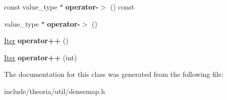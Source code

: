 \begin{DoxyCompactItemize}
\item 
\hypertarget{classtheoria_1_1util_1_1densemap_1_1Iter_ae9448561fab6d17994e686b6c63ad205}{const value\+\_\+type $\ast$ {\bfseries operator-\/$>$} () const }\label{classtheoria_1_1util_1_1densemap_1_1Iter_ae9448561fab6d17994e686b6c63ad205}

\item 
\hypertarget{classtheoria_1_1util_1_1densemap_1_1Iter_acf52921e292fe9aea8383a810dc54aa3}{value\+\_\+type $\ast$ {\bfseries operator-\/$>$} ()}\label{classtheoria_1_1util_1_1densemap_1_1Iter_acf52921e292fe9aea8383a810dc54aa3}

\item 
\hypertarget{classtheoria_1_1util_1_1densemap_1_1Iter_a484492c01c0db1a25dc4e475d99ba82f}{\hyperlink{classtheoria_1_1util_1_1densemap_1_1Iter}{Iter} {\bfseries operator++} ()}\label{classtheoria_1_1util_1_1densemap_1_1Iter_a484492c01c0db1a25dc4e475d99ba82f}

\item 
\hypertarget{classtheoria_1_1util_1_1densemap_1_1Iter_aa31a8c83fd8fefd48b6d43b778acbee5}{\hyperlink{classtheoria_1_1util_1_1densemap_1_1Iter}{Iter} {\bfseries operator++} (int)}\label{classtheoria_1_1util_1_1densemap_1_1Iter_aa31a8c83fd8fefd48b6d43b778acbee5}

\end{DoxyCompactItemize}


The documentation for this class was generated from the following file\+:\begin{DoxyCompactItemize}
\item 
include/theoria/util/densemap.\+h\end{DoxyCompactItemize}
